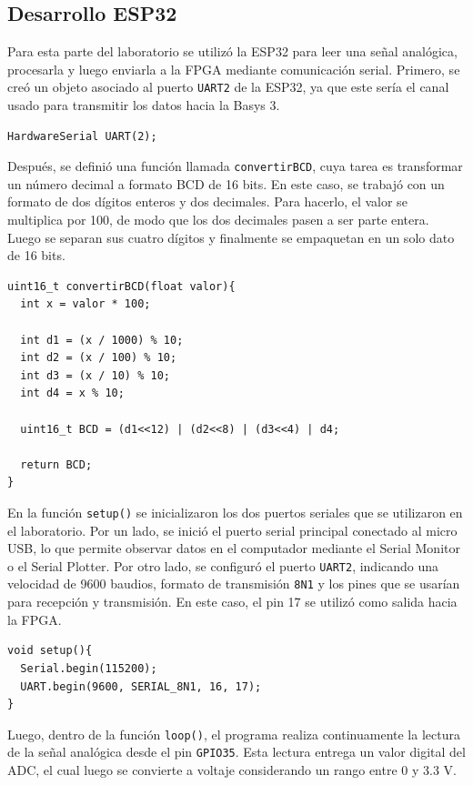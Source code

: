\documentclass[letterpaper, 12pt]{article}
\begin{document}
\subsection{Desarrollo ESP32}

Para esta parte del laboratorio se utilizó la ESP32 para leer una señal analógica, procesarla y luego enviarla a la FPGA mediante comunicación serial. Primero, se creó un objeto asociado al puerto \texttt{UART2} de la ESP32, ya que este sería el canal usado para transmitir los datos hacia la Basys 3.

\begin{lstlisting}
HardwareSerial UART(2);
\end{lstlisting}

Después, se definió una función llamada \texttt{convertirBCD}, cuya tarea es transformar un número decimal a formato BCD de 16 bits. En este caso, se trabajó con un formato de dos dígitos enteros y dos decimales. Para hacerlo, el valor se multiplica por 100, de modo que los dos decimales pasen a ser parte entera. Luego se separan sus cuatro dígitos y finalmente se empaquetan en un solo dato de 16 bits.

\begin{lstlisting}
uint16_t convertirBCD(float valor){
  int x = valor * 100;

  int d1 = (x / 1000) % 10;
  int d2 = (x / 100) % 10;
  int d3 = (x / 10) % 10;
  int d4 = x % 10;

  uint16_t BCD = (d1<<12) | (d2<<8) | (d3<<4) | d4;

  return BCD;
}
\end{lstlisting}

En la función \texttt{setup()} se inicializaron los dos puertos seriales que se utilizaron en el laboratorio. Por un lado, se inició el puerto serial principal conectado al micro USB, lo que permite observar datos en el computador mediante el Serial Monitor o el Serial Plotter. Por otro lado, se configuró el puerto \texttt{UART2}, indicando una velocidad de 9600 baudios, formato de transmisión \texttt{8N1} y los pines que se usarían para recepción y transmisión. En este caso, el pin 17 se utilizó como salida hacia la FPGA.

\begin{lstlisting}
void setup(){
  Serial.begin(115200);
  UART.begin(9600, SERIAL_8N1, 16, 17);
}
\end{lstlisting}

Luego, dentro de la función \texttt{loop()}, el programa realiza continuamente la lectura de la señal analógica desde el pin \texttt{GPIO35}. Esta lectura entrega un valor digital del ADC, el cual luego se convierte a voltaje considerando un rango entre 0 y 3.3 V.
\end{document}

